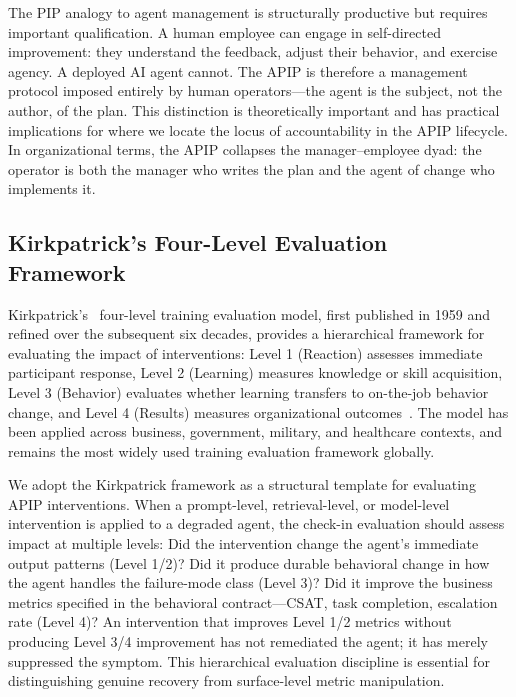 \documentclass[conference]{IEEEtran}
\begin{document}
The PIP analogy to agent management is structurally productive but requires
important qualification. A human employee can engage in self-directed
improvement: they understand the feedback, adjust their behavior, and exercise
agency. A deployed AI agent cannot. The APIP is therefore a management protocol
imposed entirely by human operators---the agent is the subject, not the author,
of the plan. This distinction is theoretically important and has practical
implications for where we locate the locus of accountability in the APIP
lifecycle. In organizational terms, the APIP collapses the manager--employee
dyad: the operator is both the manager who writes the plan and the agent of
change who implements it.

\subsection{Kirkpatrick's Four-Level Evaluation Framework}
\label{subsec:kirkpatrick}

Kirkpatrick's~\cite{kirkpatrick1994evaluating} four-level training evaluation
model, first published in 1959 and refined over the subsequent six decades,
provides a hierarchical framework for evaluating the impact of interventions:
Level 1 (Reaction) assesses immediate participant response, Level 2 (Learning)
measures knowledge or skill acquisition, Level 3 (Behavior) evaluates whether
learning transfers to on-the-job behavior change, and Level 4 (Results)
measures organizational outcomes~\cite{kirkpatrick1994evaluating,kirkpatrick2016four}.
The model has been applied across business, government, military, and
healthcare contexts, and remains the most widely used training evaluation
framework globally.

We adopt the Kirkpatrick framework as a structural template for evaluating APIP
interventions. When a prompt-level, retrieval-level, or model-level
intervention is applied to a degraded agent, the check-in evaluation should
assess impact at multiple levels: Did the intervention change the agent's
immediate output patterns (Level 1/2)? Did it produce durable behavioral change
in how the agent handles the failure-mode class (Level 3)? Did it improve the
business metrics specified in the behavioral contract---CSAT, task completion,
escalation rate (Level 4)? An intervention that improves Level 1/2 metrics
without producing Level 3/4 improvement has not remediated the agent; it has
merely suppressed the symptom. This hierarchical evaluation discipline is
essential for distinguishing genuine recovery from surface-level metric
manipulation.
\end{document}
